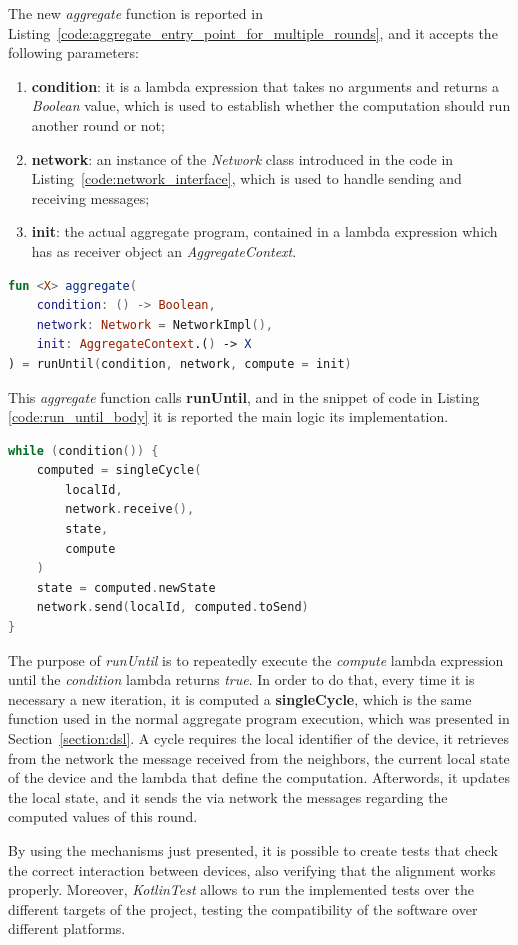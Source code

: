 The new \textit{aggregate} function is reported in Listing~\ref{code:aggregate_entry_point_for_multiple_rounds}, and it accepts the following parameters:
\begin{enumerate}
    \item \textbf{condition}: it is a lambda expression that takes no arguments and returns a \textit{Boolean} value, which is used to establish whether the computation should run another round or not;
    \item \textbf{network}: an instance of the \textit{Network} class introduced in the code in Listing~\ref{code:network_interface}, which is used to handle sending and receiving messages;
    \item \textbf{init}: the actual aggregate program, contained in a lambda expression which has as receiver object an \textit{AggregateContext}.
\end{enumerate}

\begin{lstlisting}[caption={Aggregate programming entry point used to compute multiple rounds}, captionpos=b, language=Kotlin, label={code:aggregate_entry_point_for_multiple_rounds}]
fun <X> aggregate(
    condition: () -> Boolean,
    network: Network = NetworkImpl(),
    init: AggregateContext.() -> X
) = runUntil(condition, network, compute = init)
\end{lstlisting}
This \textit{aggregate} function calls \textbf{runUntil},  and in the snippet of code in Listing \ref{code:run_until_body} it is reported the main logic its implementation.
\begin{lstlisting}[caption={Main logic of the \textit{runUntil} function}, captionpos=b, language=Kotlin, label={code:run_until_body}]
while (condition()) {
    computed = singleCycle(
        localId,
        network.receive(),
        state,
        compute
    )
    state = computed.newState
    network.send(localId, computed.toSend)
}
\end{lstlisting}

The purpose of \textit{runUntil} is to repeatedly execute the \textit{compute} lambda expression until the \textit{condition} lambda returns \textit{true}.\newline
In order to do that, every time it is necessary a new iteration, it is computed a \textbf{singleCycle}, which is the same function used in the normal aggregate program execution, which was presented in Section~\ref{section:dsl}. A cycle requires the local identifier of the device, it retrieves from the network the message received from the neighbors, the current local state of the device and the lambda that define the computation.\newline
Afterwords, it updates the local state, and it sends the via network the messages regarding the computed values of this round.

By using the mechanisms just presented, it is possible to create tests that check the correct interaction between devices, also verifying that the alignment works properly. Moreover, \textit{KotlinTest} allows to run the implemented tests over the different targets of the project, testing the compatibility of the software over different platforms.
